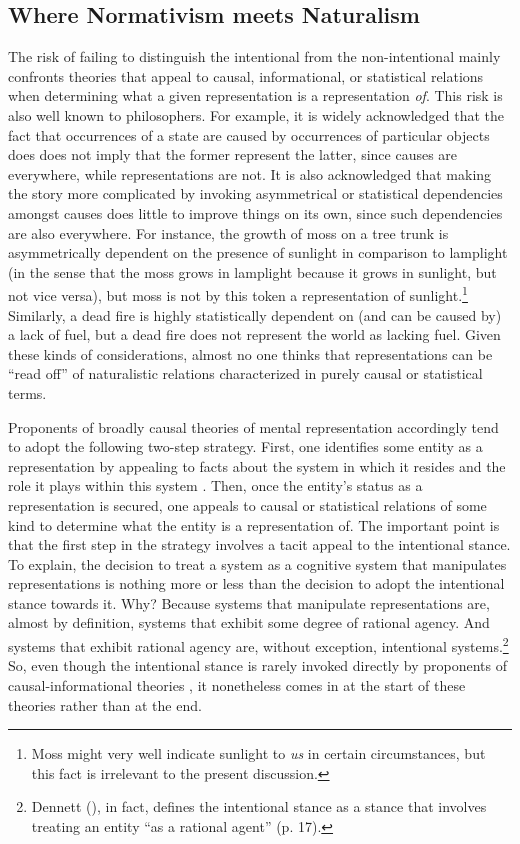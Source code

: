 \subsection{Where Normativism meets Naturalism}

The risk of failing to distinguish the intentional from the non-intentional mainly confronts theories that appeal to causal, informational, or statistical relations when determining what a given representation is a representation \textit{of}. This risk is also well known to philosophers. For example, it is widely acknowledged that the fact that occurrences of a state are caused by occurrences of particular objects does does not imply that the former represent the latter, since causes are everywhere, while representations are not. It is also acknowledged that making the story more complicated by invoking asymmetrical \citep[][Ch. 4]{Fodor:1987} or statistical \citep{Eliasmith:2000} dependencies amongst causes does little to improve things on its own, since such dependencies are also everywhere. For instance, the growth of moss on a tree trunk is asymmetrically dependent on the presence of sunlight in comparison to lamplight (in the sense that the moss grows in lamplight because it grows in sunlight, but not vice versa), but moss is not by this token a representation of sunlight.\footnote{Moss might very well indicate sunlight to \textit{us} in certain circumstances, but this fact is irrelevant to the present discussion.} Similarly, a dead fire is highly statistically dependent on (and can be caused by) a lack of fuel, but a dead fire does not represent the world as lacking fuel. Given these kinds of considerations, almost no one thinks that representations can be ``read off'' of naturalistic relations characterized in purely causal or statistical terms. 

Proponents of broadly causal theories of mental representation accordingly tend to adopt the following two-step strategy. First, one identifies some entity as a representation by appealing to facts about the system in which it resides and the role it plays within this system \citep[see e.g.,][]{Eliasmith:2000}. Then, once the entity's status as a representation is secured, one appeals to causal or statistical relations of some kind to determine what the entity is a representation of. The important point is that the first step in the strategy involves a tacit appeal to the intentional stance. To explain, the decision to treat a system as a cognitive system that manipulates representations is nothing more or less than the decision to adopt the intentional stance towards it. Why? Because systems that manipulate representations are, almost by definition, systems that exhibit some degree of rational agency. And systems that exhibit rational agency are, without exception, intentional systems.\footnote{Dennett (\cite{Dennett:1987}), in fact, defines the intentional stance as a stance that involves treating an entity ``as a rational agent'' (p. 17).} So, even though the intentional stance is rarely invoked directly by proponents of causal-informational theories \citep[cf.][]{Dretske:1986}, it nonetheless comes in at the start of these theories rather than at the end. 

